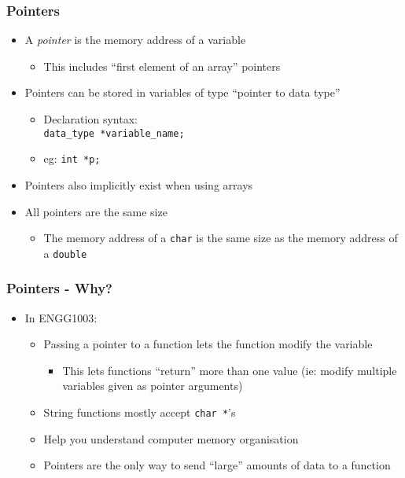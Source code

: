 \documentclass[14pt]{beamer}
\begin{document}
\begin{frame}
\frametitle{Pointers}
\begin{itemize}
\item A \textit{pointer} is the memory address of a variable
	\begin{itemize}
		\item This includes ``first element of an array'' pointers
	\end{itemize}
\item Pointers can be stored in variables of type ``pointer to data type''
	\begin{itemize}
		\item Declaration syntax:\\ \texttt{data\_type *variable\_name;}
		\item eg: \texttt{int *p;}
	\end{itemize}
\item Pointers also implicitly exist when using arrays
\item All pointers are the same size
	\begin{itemize}
		\item The memory address of a \texttt{char} is the same size as the memory address of a \texttt{double}
	\end{itemize}
\end{itemize}
\end{frame}

\begin{frame}
\frametitle{Pointers - Why?}
\begin{itemize}
\item In ENGG1003:
	\begin{itemize}
		\item Passing a pointer to a function lets the function modify the variable
		\begin{itemize}
		\item This lets functions ``return'' more than one value (ie: modify multiple variables given as pointer arguments)
		\end{itemize}
		\item String functions mostly accept \texttt{char *}'s
		\item Help you understand computer memory organisation
		\item Pointers are the only way to send ``large'' amounts of data to a function
	\end{itemize}
\end{itemize}
\end{frame}
\end{document}
